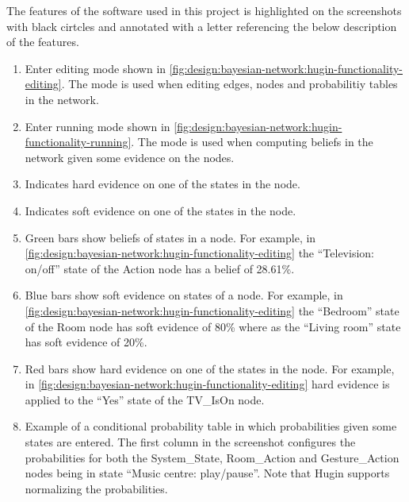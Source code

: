 The features of the software used in this project is highlighted on the screenshots with black cirtcles and annotated with a letter referencing the below description of the features.

\begin{enumerate}[label=\Alph*.]
\item Enter editing mode shown in \cref{fig:design:bayesian-network:hugin-functionality-editing}. The mode is used when editing edges, nodes and probabilitiy tables in the network.
\item Enter running mode shown in \cref{fig:design:bayesian-network:hugin-functionality-running}. The mode is used when computing beliefs in the network given some evidence on the nodes.
\item Indicates hard evidence on one of the states in the node.
\item Indicates soft evidence on one of the states in the node.
\item Green bars show beliefs of states in a node. For example, in \cref{fig:design:bayesian-network:hugin-functionality-editing} the ``Television: on/off'' state of the Action node has a belief of 28.61\%.
\item Blue bars show soft evidence on states of a node. For example, in \cref{fig:design:bayesian-network:hugin-functionality-editing} the ``Bedroom'' state of the Room node has soft evidence of 80\% where as the ``Living room'' state has soft evidence of 20\%.
\item Red bars show hard evidence on one of the states in the node. For example, in \cref{fig:design:bayesian-network:hugin-functionality-editing} hard evidence is applied to the ``Yes'' state of the TV\_IsOn node.
\item Example of a conditional probability table in which probabilities given some states are entered. The first column in the screenshot configures the probabilities for both the System\_State, Room\_Action and Gesture\_Action nodes being in state ``Music centre: play/pause''. Note that Hugin supports normalizing the probabilities.
\end{enumerate}

